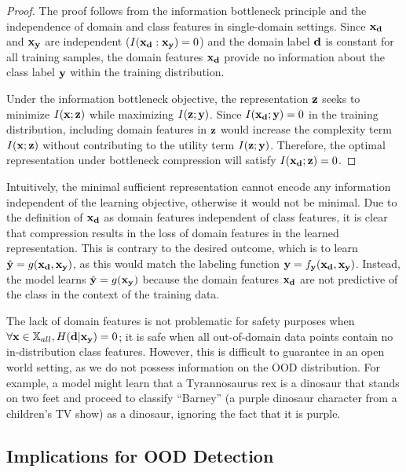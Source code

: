 \documentclass[11pt, oneside]{book}
\theoremstyle{plain}
\theoremstyle{definition}
\theoremstyle{remark}
\begin{document}
\begin{proof}
The proof follows from the information bottleneck principle and the independence of domain and class features in single-domain settings. Since ${\mathbf{x}}_{\mathbf{d}}$ and ${\mathbf{x}}_{\mathbf{y}}$ are independent ($I({\mathbf{x}}_{\mathbf{d}}:{\mathbf{x}}_{\mathbf{y}}) = 0$) and the domain label ${\mathbf{d}}$ is constant for all training samples, the domain features ${\mathbf{x}}_{\mathbf{d}}$ provide no information about the class label ${\mathbf{y}}$ within the training distribution.

Under the information bottleneck objective, the representation ${\mathbf{z}}$ seeks to minimize $I({\mathbf{x}}; {\mathbf{z}})$ while maximizing $I({\mathbf{z}}; {\mathbf{y}})$. Since $I({\mathbf{x}}_{\mathbf{d}}; {\mathbf{y}}) = 0$ in the training distribution, including domain features in ${\mathbf{z}}$ would increase the complexity term $I({\mathbf{x}}; {\mathbf{z}})$ without contributing to the utility term $I({\mathbf{z}}; {\mathbf{y}})$. Therefore, the optimal representation under bottleneck compression will satisfy $I({\mathbf{x}}_{\mathbf{d}}; {\mathbf{z}}) = 0$.
\end{proof}

Intuitively, the minimal sufficient representation cannot encode any information independent of the learning objective, otherwise it would not be minimal. Due to the definition of ${\mathbf{x}}_{\mathbf{d}}$ as domain features independent of class features, it is clear that compression results in the loss of domain features in the learned representation. This is contrary to the desired outcome, which is to learn $\hat{{\mathbf{y}}} = g({\mathbf{x}}_{\mathbf{d}}, {\mathbf{x}}_{\mathbf{y}})$, as this would match the labeling function ${\mathbf{y}} = f_{\mathbf{y}}({\mathbf{x}}_{\mathbf{d}}, {\mathbf{x}}_{\mathbf{y}})$. Instead, the model learns $\hat{{\mathbf{y}}} = g({\mathbf{x}}_{\mathbf{y}})$ because the domain features ${\mathbf{x}}_{\mathbf{d}}$ are not predictive of the class in the context of the training data.

The lack of domain features is not problematic for safety purposes when $\forall {\mathbf{x}} \in {\mathbb{X}}_{all}, H({\mathbf{d}}|{\mathbf{x}}_{\mathbf{y}}) = 0$; it is safe when all out-of-domain data points contain no in-distribution class features. However, this is difficult to guarantee in an open world setting, as we do not possess information on the OOD distribution. For example, a model might learn that a Tyrannosaurus rex is a dinosaur that stands on two feet and proceed to classify ``Barney'' (a purple dinosaur character from a children's TV show) as a dinosaur, ignoring the fact that it is purple.

\subsection{Implications for OOD Detection}
\end{document}
